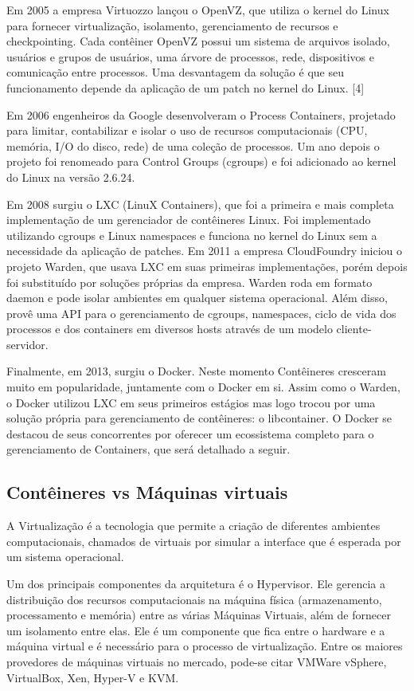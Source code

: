 \documentclass[]{politex}
\begin{document}
	Em 2005 a empresa Virtuozzo lançou o OpenVZ, que utiliza o kernel do Linux para fornecer virtualização, isolamento, gerenciamento de recursos e checkpointing. Cada contêiner OpenVZ possui um sistema de arquivos isolado, usuários e grupos de usuários, uma árvore de processos, rede, dispositivos e comunicação entre processos. Uma desvantagem da solução é que seu funcionamento depende da aplicação de um patch no kernel do Linux. [4]

	Em 2006 engenheiros da Google desenvolveram o Process Containers, projetado para limitar, contabilizar e isolar o uso de recursos computacionais (CPU, memória, I/O do disco, rede) de uma coleção de processos. Um ano depois o projeto foi renomeado para Control Groups (cgroups) e foi adicionado ao kernel do Linux na versão 2.6.24.

	Em 2008 surgiu o LXC (LinuX Containers), que foi a primeira e mais completa implementação de um gerenciador de contêineres Linux. Foi implementado utilizando cgroups e Linux namespaces e funciona no kernel do Linux sem a necessidade da aplicação de patches.
	Em 2011 a empresa CloudFoundry iniciou o projeto Warden, que usava LXC em suas primeiras implementações, porém depois foi substituído por soluções próprias da empresa. Warden roda em formato daemon e pode isolar ambientes em qualquer sistema operacional. Além disso, provê uma API para o gerenciamento de cgroups, namespaces, ciclo de vida dos processos e dos containers em diversos hosts através de um modelo cliente-servidor.

	Finalmente, em 2013, surgiu o Docker. Neste momento Contêineres cresceram muito em popularidade, juntamente com o Docker em si.
	Assim como o Warden, o Docker utilizou LXC em seus primeiros estágios mas logo trocou por uma solução própria para gerenciamento de contêineres: o libcontainer.
	O Docker se destacou de seus concorrentes por oferecer um ecossistema completo para o gerenciamento de Containers, que será detalhado a seguir.
	
	\subsection{Contêineres vs Máquinas virtuais}
	
	A Virtualização é a tecnologia que permite a criação de diferentes ambientes computacionais, chamados de virtuais por simular a interface que é esperada por um sistema operacional.
	
	Um dos principais componentes da arquitetura é o Hypervisor. Ele gerencia a distribuição dos recursos computacionais na máquina física (armazenamento, processamento e memória) entre as várias Máquinas Virtuais, além de fornecer um isolamento entre elas. Ele é um componente que fica entre o hardware e a máquina virtual e é necessário para o processo de virtualização.
	Entre os maiores provedores de máquinas virtuais no mercado, pode-se citar VMWare vSphere, VirtualBox, Xen, Hyper-V e KVM.
\end{document}
